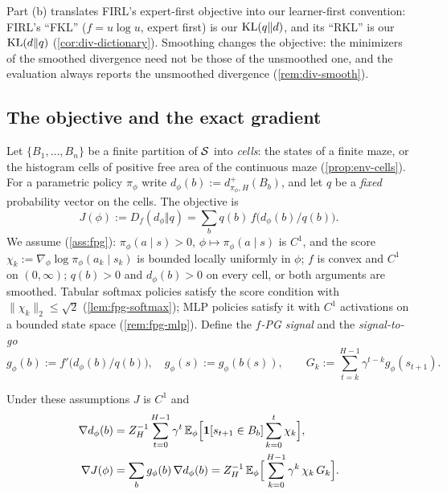 Part (b) translates FIRL's expert-first objective into our learner-first convention: FIRL's ``FKL'' ($f=u\log u$, expert first) is our $\mathrm{KL}(q\Vert d)$, and its ``RKL'' is our $\mathrm{KL}(d\Vert q)$ (\cref{cor:div-dictionary}).
Smoothing changes the objective: the minimizers of the smoothed divergence need not be those of the unsmoothed one, and the evaluation always reports the unsmoothed divergence (\cref{rem:div-smooth}).

\subsection{The objective and the exact gradient}

Let $\{B_1,\dots,B_n\}$ be a finite partition of $\mathcal{S}$ into \emph{cells}: the states of a finite maze, or the  histogram cells of positive free area of the continuous maze (\cref{prop:env-cells}).
For a parametric policy $\pi_\phi$ write $d_\phi(b):=d^+_{\pi_\phi,H}(B_b)$, and let $q$ be a \emph{fixed} probability vector on the cells.
The objective is
\begin{equation}\label{eq:m-fpg-J}
J(\phi):=D_f(d_\phi\Vert q)=\sum_bq(b)\,f\big(d_\phi(b)/q(b)\big).
\end{equation}
We assume (\cref{ass:fpg}): $\pi_\phi(a\mid s)>0$, $\phi\mapsto\pi_\phi(a\mid s)$ is $C^1$, and the score $\chi_k:=\nabla_\phi\log\pi_\phi(a_k\mid s_k)$ is bounded locally uniformly in $\phi$; $f$ is convex and $C^1$ on $(0,\infty)$; $q(b)>0$ and $d_\phi(b)>0$ on every cell, or both arguments are smoothed.
Tabular softmax policies satisfy the score condition with $\lVert\chi_k\rVert_2\le\sqrt2$ (\cref{lem:fpg-softmax}); MLP policies satisfy it with $C^1$ activations on a bounded state space (\cref{rem:fpg-mlp}).
Define the \emph{$f$-PG signal} and the \emph{signal-to-go}
\[
g_\phi(b):=f'\big(d_\phi(b)/q(b)\big),\quad g_\phi(s):=g_\phi(b(s)),\qquad G_k:=\sum_{t=k}^{H-1}\gamma^{t-k}g_\phi(s_{t+1}).
\]

\begin{theorem}\label{thm:m-fpg}
Under these assumptions $J$ is $C^1$ and
\begin{align}
\nabla d_\phi(b)&=Z_H^{-1}\sum_{t=0}^{H-1}\gamma^t\,\mathbb{E}_\phi\Big[\mathbf{1}[s_{t+1}\in B_b]\sum_{k=0}^{t}\chi_k\Big],\label{eq:m-fpg-dd}\\
\nabla J(\phi)&=\sum_bg_\phi(b)\,\nabla d_\phi(b)=Z_H^{-1}\,\mathbb{E}_\phi\Big[\sum_{k=0}^{H-1}\gamma^k\,\chi_k\,G_k\Big].\label{eq:m-fpg-grad}
\end{align}
\end{theorem}

